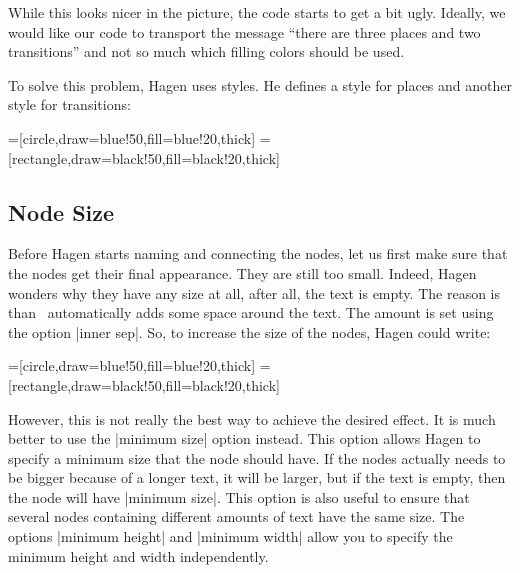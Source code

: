 While this looks nicer in the picture, the code starts to get a bit
ugly. Ideally, we would like our code to transport the message ``there
are three places and two transitions'' and not so much which
filling colors should be used.

To solve this problem, Hagen uses styles. He defines a style for
places and another style for transitions:

\begin{codeexample}[]
=[circle,draw=blue!50,fill=blue!20,thick]
=[rectangle,draw=black!50,fill=black!20,thick]
\end{codeexample}


\subsection{Node Size}

Before Hagen starts naming and connecting the nodes, let us first
make sure that the nodes get their final appearance. They are still
too small. Indeed, Hagen wonders why they have any size at all, after
all, the text is empty. The reason is than \tikzname\ automatically
adds some space around the text. The amount is set using the option
|inner sep|. So, to increase the size of the nodes, Hagen could write:

\begin{codeexample}[]
=[circle,draw=blue!50,fill=blue!20,thick]
=[rectangle,draw=black!50,fill=black!20,thick]
\end{codeexample}

However, this is not really the best way to achieve the desired
effect. It is much better to use the |minimum size| option
instead. This option allows Hagen to specify a minimum size that the
node should have. If the nodes actually needs to be bigger because of
a longer text, it will be larger, but if the text is empty, then the
node will have |minimum size|. This option is also useful to ensure
that several nodes containing different amounts of text have the same
size. The options |minimum height| and |minimum width| allow you to
specify the minimum height and width independently. 

